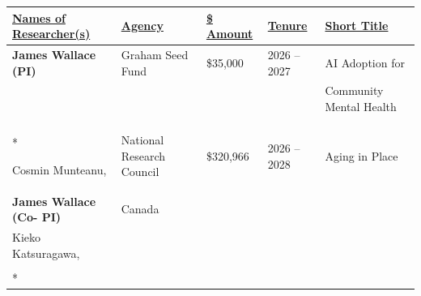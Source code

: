 \documentclass[12pt]{article}
\begin{document}
\begin{longtable}[c]{p{4.5cm} l l l p{4.5cm}}
\underline{Names of Researcher(s)}  &	\underline{Agency}		& \underline{\$ Amount}   &	\underline{Tenure}    &	\underline{Short Title} \\
\endhead

\textbf{James Wallace (PI)}       & Graham Seed Fund   & \$35,000   & 2026 -- 2027 & AI Adoption for \\
& & & & Community Mental Health \\
\\*

Cosmin Munteanu, &   National Research Council & \$320,966 & 2026 -- 2028 & Aging in Place \\
\textbf{James Wallace (Co- PI)}  & Canada \\ 
Kieko Katsuragawa, \\
\\*











\end{longtable}
\end{document}
